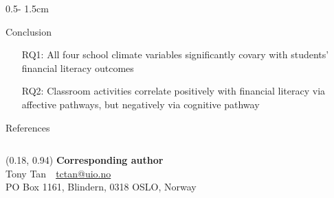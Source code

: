 \documentclass{uioposter}
\begin{document}
\begin{frame}
\begin{columns}[onlytextwidth]
\begin{column}{0.5\textwidth - 1.5cm}
    \begin{block}{Conclusion}
        \begin{enumerate}
            \item[RQ1:] All four school climate variables significantly covary with students' financial literacy outcomes
            \item[RQ2:] Classroom activities correlate positively with financial literacy via affective pathways, but negatively via cognitive pathway
        \end{enumerate}
    \end{block}

    \begin{block}{References}
        \printbibliography
    \end{block}

\end{column}

\end{columns}

\begin{textblock}{0.5}(0.18, 0.94)
    \color{white}
    \sffamily
    \textbf{Corresponding author}
    \\
    Tony Tan\ \ \url{tctan@uio.no}\\
    PO Box 1161, Blindern, 0318 OSLO, Norway
\end{textblock}

\end{frame}
\end{document}
